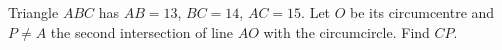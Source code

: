 Triangle $ABC$ has $AB=13$, $BC=14$, $AC=15$. Let $O$ be its circumcentre and $P\neq A$ the second intersection of line $AO$ with the circumcircle. Find $CP$.
